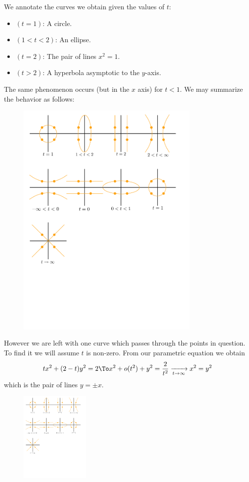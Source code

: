 \documentclass[12pt]{memoir}
\begin{document}
We annotate the curves we obtain given the values of $t$:
\vspace{-0.5em}
\begin{itemize}
    \itemsep=-0.4em
    \item $(t=1)$: A circle.
    \item $(1<t<2)$: An ellipse.
    \item $(t=2)$: The pair of lines $x^2=1$.
    \item $(t>2)$: A hyperbola asymptotic to the $y$-axis.
\end{itemize}
The same phenomenon occurs (but in the $x$ axis) for $t<1$. We may summarize the behavior as follows:\par
\begin{figure}[h!]
    \centering
    \includegraphics[width=0.8\textwidth, trim= 0.8cm 15cm 0.8cm 6.6cm,clip]{fig1.pdf}
\end{figure}
However we are left with one curve which passes through the points in question. To find it we will assume $t$ is non-zero. From our parametric equation we obtain 
$$tx^2+(2-t)y^2=2\To x^2+o(t^2)+y^2=\frac{2}{t^2}\xrightarrow[t\to\infty]{}x^2=y^2$$
which is the pair of lines $y=\pm x$.
\begin{figure}[h!]
    \centering
    \includegraphics[width=0.3\textwidth, trim= 0.8cm 7cm 16cm 14.6cm,clip]{fig1.pdf}
\end{figure}
\end{document}
